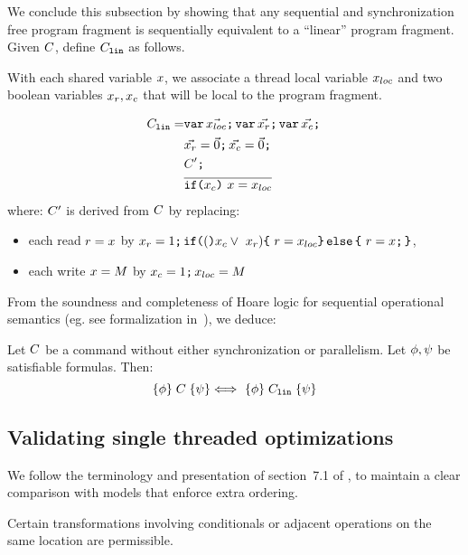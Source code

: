 We conclude this subsection by showing that any sequential and synchronization free  program fragment is sequentially equivalent to a ``linear'' program fragment.  Given $C$, define 
$C_{{\tt lin}}$ as follows.
\begin{definition}
With each shared variable $x$, we associate a thread local variable $x_{{loc}}$ and two boolean variables $x_{r},x_{c}$ that will be local to the program fragment.  

\begin{align*}
C_{{\tt lin}}= & \texttt{var}\,\vec{x_{{loc}}} \texttt{;}\,\allowbreak \texttt{var}\, \vec{x_{r}} \texttt{;}\,\allowbreak \texttt{var}\, \vec{x_{c}} \texttt{;}\,\allowbreak  \\
& \vec{x_{r}} =\vec{0} \texttt{;}\,\allowbreak \vec{x_{c}} = \vec{0} \texttt{;}\,\allowbreak \\
& C' \texttt{;}\,\allowbreak   \\
& \overline{\texttt{if}\allowbreak\texttt{(}x_{c}\texttt{)}\  x= x_{{loc}}}
\end{align*}
where:
$C'$ is derived from $C$ by replacing:
\begin{itemize}
\item  each read $r = x$ by $\aRead = 1 \SEMI \IF  (\aChanged \lor\ \aRead) \THEN\  \aReg= \aLocReg \ELSE\  \aReg= \aLoc \SEMI \FI $,
\item each write $x = M$ by $x_{c} =1 \texttt{;}\,\allowbreak x_{{loc}} = M$
\end{itemize}
\end{definition}
From the soundness and completeness of Hoare logic for sequential operational semantics (eg. see formalization in~\citet{gordonHoare}), we deduce:
\begin{theorem}
Let $C$ be a command without either synchronization or parallelism.   Let $\phi, \psi$ be satisfiable formulas. Then: 
\[ \{\phi\}\allowbreak\;C\;\allowbreak\{\psi\}  \Longleftrightarrow\  \{\phi\}\allowbreak\;C_{{\tt lin}}\;\allowbreak\{\psi\} \]
\end{theorem}


\subsection{Validating single threaded optimizations}
We follow the terminology and presentation of section~7.1 of
\citet{Dolan:2018:BDR:3192366.3192421}, to maintain a clear comparison with models that enforce extra ordering.  

Certain transformations involving conditionals or adjacent operations on the same location are permissible. 
 
